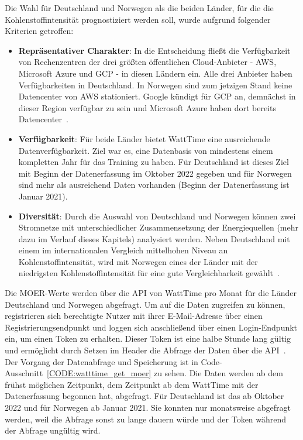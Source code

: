 Die Wahl für Deutschland und Norwegen als die beiden Länder, für die die Kohlenstoffintensität prognostiziert werden soll, wurde aufgrund folgender Kriterien getroffen:
\begin{itemize}
 \item \textbf{Repräsentativer Charakter}: In die Entscheidung fließt die Verfügbarkeit von Rechenzentren der drei größten öffentlichen Cloud-Anbieter - \ac{AWS}, Microsoft Azure und \ac{GCP} - in diesen Ländern ein.
 Alle drei Anbieter haben Verfügbarkeiten in Deutschland.
 In Norwegen sind zum jetzigen Stand keine Datencenter von \ac{AWS} stationiert.
 Google kündigt für \ac{GCP} an, demnächst in dieser Region verfügbar zu sein und Microsoft Azure haben dort bereits Datencenter~\cite{AmazonWebServices.20240318T18:30:19.000Z}\cite{GoogleCloud.20240311T07:04:17.000Z}\cite{Microsoft.20240307T01:34:37.000Z}.
 \item \textbf{Verfügbarkeit}: Für beide Länder bietet WattTime eine ausreichende Datenverfügbarkeit.
 Ziel war es, eine Datenbasis von mindestens einem kompletten Jahr für das Training zu haben.
 Für Deutschland ist dieses Ziel mit Beginn der Datenerfassung im Oktober 2022 gegeben und für Norwegen sind mehr als ausreichend Daten vorhanden (Beginn der Datenerfassung ist Januar 2021).
 \item \textbf{Diversität}: Durch die Auswahl von Deutschland und Norwegen können zwei Stromnetze mit unterschiedlicher Zusammensetzung der Energiequellen (mehr dazu im Verlauf dieses Kapitels) analysiert werden.
 Neben Deutschland mit einem im internationalen Vergleich mittelhohen Niveau an Kohlenstoffintensität, wird mit Norwegen eines der Länder mit der niedrigsten Kohlenstoffintensität für eine gute Vergleichbarkeit gewählt~\cite{ElectricityMaps.20240305T20:54:29.000Z}.
\end{itemize}
Die \ac{MOER}-Werte werden über die \ac{API} von WattTime pro Monat für die Länder Deutschland und Norwegen abgefragt.
Um auf die Daten zugreifen zu können, registrieren sich berechtigte Nutzer mit ihrer E-Mail-Adresse über einen Registrierungsendpunkt und loggen sich anschließend über einen Login-Endpunkt ein, um einen Token zu erhalten.
Dieser Token ist eine halbe Stunde lang gültig und ermöglicht durch Setzen im Header die Abfrage der Daten über die \ac{API}~\cite{.20240220T17:59:19.000Z}.
Der Vorgang der Datenabfrage und Speicherung ist in Code-Ausschnitt~\ref{CODE:watttime_get_moer} zu sehen.
Die Daten werden ab dem frühst möglichen Zeitpunkt, dem Zeitpunkt ab dem WattTime mit der Datenerfassung begonnen hat, abgefragt.
Für Deutschland ist das ab Oktober 2022 und für Norwegen ab Januar 2021.
Sie konnten nur monatsweise abgefragt werden, weil die Abfrage sonst zu lange dauern würde und der Token während der Abfrage ungültig wird.

